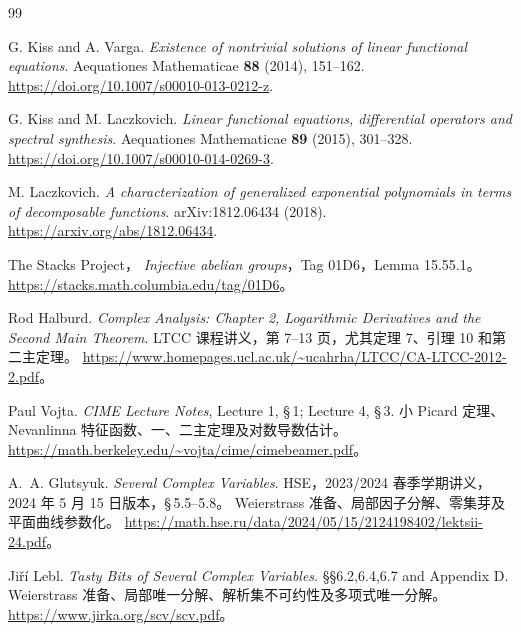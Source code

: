 \documentclass[11pt,a4paper,oneside,openany]{book}
\theoremstyle{lecture}
\numberwithin{equation}{section}
\begin{document}
\backmatter

\begin{thebibliography}{99}

\raggedright

G. Kiss and A. Varga.
\textit{Existence of nontrivial solutions of linear functional equations}.
Aequationes Mathematicae \textbf{88} (2014), 151--162.
\url{https://doi.org/10.1007/s00010-013-0212-z}.

G. Kiss and M. Laczkovich.
\textit{Linear functional equations, differential operators and spectral synthesis}.
Aequationes Mathematicae \textbf{89} (2015), 301--328.
\url{https://doi.org/10.1007/s00010-014-0269-3}.

M. Laczkovich.
\textit{A characterization of generalized exponential polynomials in terms of decomposable functions}.
arXiv:1812.06434 (2018).
\url{https://arxiv.org/abs/1812.06434}.

The Stacks Project，
\emph{Injective abelian groups}，Tag 01D6，Lemma 15.55.1。
\url{https://stacks.math.columbia.edu/tag/01D6}。



Rod Halburd.
\emph{Complex Analysis: Chapter 2, Logarithmic Derivatives and the Second Main Theorem}.
LTCC 课程讲义，第 7--13 页，尤其定理 7、引理 10 和第二主定理。
\url{https://www.homepages.ucl.ac.uk/~ucahrha/LTCC/CA-LTCC-2012-2.pdf}。

Paul Vojta.
\emph{CIME Lecture Notes}, Lecture 1, \S\,1; Lecture 4, \S\,3.
小 Picard 定理、Nevanlinna 特征函数、一、二主定理及对数导数估计。
\url{https://math.berkeley.edu/~vojta/cime/cimebeamer.pdf}。

A.~A. Glutsyuk.
\emph{Several Complex Variables}.
HSE，2023/2024 春季学期讲义，2024 年 5 月 15 日版本，\S\,5.5--5.8。
Weierstrass 准备、局部因子分解、零集芽及平面曲线参数化。
\url{https://math.hse.ru/data/2024/05/15/2124198402/lektsii-24.pdf}。

Ji\v r\'i Lebl.
\emph{Tasty Bits of Several Complex Variables}.
\S\S6.2,6.4,6.7 and Appendix D.
Weierstrass 准备、局部唯一分解、解析集不可约性及多项式唯一分解。
\url{https://www.jirka.org/scv/scv.pdf}。
\end{thebibliography}
\end{document}
